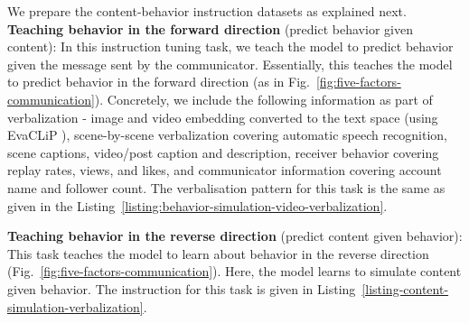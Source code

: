 

We prepare the content-behavior instruction datasets as explained next.\\
\textbf{Teaching behavior in the forward direction} (predict behavior given content): In this instruction tuning task, we teach the model to predict behavior given the message sent by the communicator. Essentially, this teaches the model to predict behavior in the forward direction (as in Fig.~\ref{fig:five-factors-communication}). Concretely, we include the following information as part of verbalization - image and video embedding converted to the text space (using EvaCLiP \citep{sun2023eva}), scene-by-scene verbalization covering automatic speech recognition, scene captions, video/post caption and description, receiver behavior covering replay rates, views, and likes, and communicator information covering account name and follower count. The verbalisation pattern for this task is the same as given in the Listing~\ref{listing:behavior-simulation-video-verbalization}.

\textbf{Teaching behavior in the reverse direction} (predict content given behavior): This task teaches the model to learn about behavior in the reverse direction (Fig.~\ref{fig:five-factors-communication}). Here, the model learns to simulate content given behavior. The instruction for this task is given in Listing~\ref{listing-content-simulation-verbalization}.






